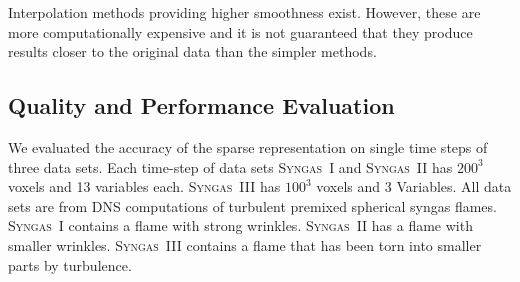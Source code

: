 Interpolation methods providing higher smoothness exist. However, these are more
computationally expensive and it is not guaranteed that they produce results
closer to the original data than the simpler methods.

\subsection{Quality and Performance Evaluation} %
\label{ssec:evaluation_compression}

%
We evaluated the accuracy of the sparse representation on single time steps of
three data sets. Each time-step of data sets \textsc{Syngas~I} and
\textsc{Syngas~II} has $\text{200}^3$ voxels and 13 variables each.
\textsc{Syngas~III} has $\text{100}^3$ voxels and 3 Variables. All data sets
are from \ac{DNS} computations of turbulent premixed spherical syngas flames.
\textsc{Syngas~I} contains a flame with strong wrinkles. \textsc{Syngas~II} has
a flame with smaller wrinkles. \textsc{Syngas~III} contains a flame that has
been torn into smaller parts by turbulence.
%
%
%

